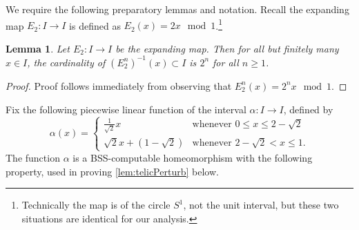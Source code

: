 \documentclass{amsart}
\theoremstyle{theorem}
\newtheorem{lemma}[theorem]{Lemma}
\theoremstyle{remark}
\begin{document}
We require the following preparatory lemmas and notation. Recall the expanding map $E_2:I\rightarrow I$ is defined as $E_2(x) = 2x\mod 1$.\footnote{Technically the map is of the circle $S^1$, not the unit interval, but these two situations are identical for our analysis.}

\begin{lemma}\label{lem:2nToOne}
Let $E_2:I\rightarrow I$ be the expanding map. Then for all but finitely many $x \in I$, the cardinality of $(E^n_2)^{-1}(x)\subset I$ is $2^n$ for all $n \geq 1$.
\end{lemma}
\begin{proof}
Proof follows immediately from observing that $E^n_2(x) = 2^nx \mod 1$.
\end{proof}

Fix the following piecewise linear function of the interval $\alpha:I\rightarrow I$, defined by
\[
\alpha(x) = \begin{cases}
\frac{1}{\sqrt{2}}x &\text{whenever } 0\leq x \leq 2-\sqrt{2}\\
\sqrt{2}x + (1-\sqrt{2}) &\text{whenever } 2-\sqrt{2}< x \leq 1.
\end{cases}
\]
The function $\alpha$ is a BSS-computable homeomorphism with the following property, used in proving \cref{lem:telicPerturb} below.
\end{document}

